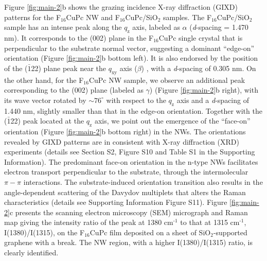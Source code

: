 Figure \ref{fig:main-2}b shows the grazing incidence X-ray diffraction
(GIXD) patterns for the F\(_{\text{16}}\)CuPc NW and F\(_{\text{16}}\)CuPc/SiO\(_{\text{2}}\)
samples. The F\(_{\text{16}}\)CuPc/SiO\(_{\text{2}}\) sample has an intense peak along the
\(q_{\mathrm{z}}\) axis, labeled as \(\alpha\) (\emph{d}-spacing = 1.470
nm). It corresponds to the (002) plane in the F\(_{\text{16}}\)CuPc single
crystal \cite{Yang_2009_F16_PTCDA} that is perpendicular to the
substrate normal vector, suggesting a dominant ``edge-on'' orientation
(Figure \ref{fig:main-2}b bottom left). It is also endorsed by the
position of the (\(\bar{1}\)22) plane peak near the \(q_{\mathrm{xy}}\)
axis (\(\beta\)) \cite{Yoon_2010_crystal_F16}, with a \emph{d}-spacing of
0.305 nm. On the other hand, for the F\(_{\text{16}}\)CuPc NW sample, we observe
an additional peak corresponding to the (002) plane (labeled as
\(\gamma\)) (Figure \ref{fig:main-2}b right), with its wave vector rotated
by \(\sim 76^{\circ}\) with respect to the \(q_{\mathrm{z}}\) axis and a
\emph{d}-spacing of 1.440 nm, slightly smaller than that in the edge-on
orientation. Together with the (\(\bar{1}\)22) peak located at the
\(q_{\mathrm{z}}\) axis, we point out the emergence of the ``face-on''
orientation (Figure \ref{fig:main-2}b bottom right) in the NWs. The
orientations revealed by GIXD patterns are in consistent with X-ray
diffraction (XRD) experiments (details see Section S2, Figure S10 and
Table S1 in the Supporting Information). The predominant face-on
orientation in the n-type NWs facilitates electron transport
perpendicular to the substrate, through the intermolecular \(\pi-\pi\)
interactions. The substrate-induced orientation transition also
results in the angle-dependent scattering of the Davydov multiplets
that alters the Raman characteristics \cite{Cerdeira_2013_RamanF16}
(details see Supporting Information Figure S11). Figure
\ref{fig:main-2}c presents the scanning electron microscopy (SEM)
micrograph and Raman map giving the intensity ratio of the peak at
1380 cm\(^{\text{-1}}\) to that at 1315 cm\(^{\text{-1}}\), I(1380)/I(1315), on the
F\(_{\text{16}}\)CuPc film deposited on a sheet of SiO\(_{\text{2}}\)-supported graphene
with a break. The NW region, with a higher I(1380)/I(1315) ratio, is
clearly identified.


